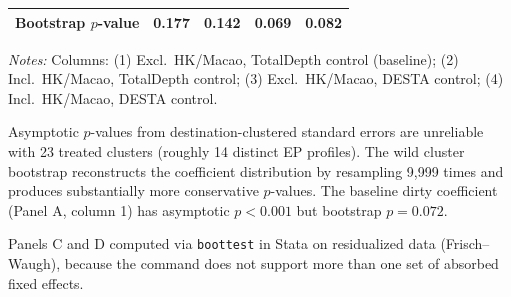 \begin{table}[htbp]
\begin{threeparttable}
\begin{tabular}{lcccc}
\quad Bootstrap $p$-value & 0.177 & 0.142 & 0.069 & 0.082 \\
\bottomrule
\end{tabular}
\begin{tablenotes}[flushleft]\footnotesize
\item \emph{Notes:} Columns: (1) Excl.\ HK/Macao, TotalDepth control (baseline); (2) Incl.\ HK/Macao, TotalDepth control; (3) Excl.\ HK/Macao, DESTA control; (4) Incl.\ HK/Macao, DESTA control.
\item Asymptotic $p$-values from destination-clustered standard errors are unreliable with 23 treated clusters (roughly 14 distinct EP profiles). The wild cluster bootstrap reconstructs the coefficient distribution by resampling 9,999 times and produces substantially more conservative $p$-values. The baseline dirty coefficient (Panel A, column 1) has asymptotic $p < 0.001$ but bootstrap $p = 0.072$.
\item Panels C and D computed via \texttt{boottest} in Stata on residualized data (Frisch--Waugh), because the command does not support more than one set of absorbed fixed effects.
\end{tablenotes}
\end{threeparttable}
\end{table}
